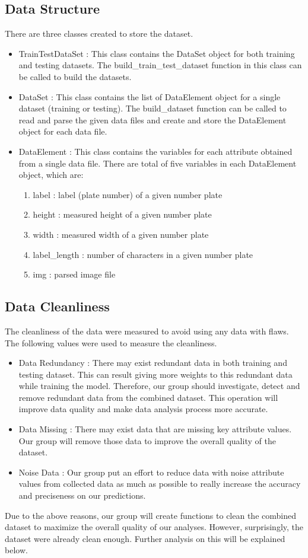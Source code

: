 \documentclass[conference]{IEEEtran}
\begin{document}
\subsection{Data Structure}
There are three classes created to store the dataset.
\begin{itemize}
\item TrainTestDataSet : This class contains the DataSet object for both training and testing datasets. The build\_train\_test\_dataset function in this class can be called to build the datasets.
\item DataSet : This class contains the list of DataElement object for a single dataset (training or testing). The build\_dataset function can be called to read and parse the given data files and create and store the DataElement object for each data file.
\item DataElement : This class contains the variables for each attribute obtained from a single data file. There are total of five variables in each DataElement object, which are:
\begin{enumerate}
\item label : label (plate number) of a given number plate
\item height : measured height of a given number plate
\item width : measured width of a given number plate
\item label\_length  : number of characters in a given number plate
\item img : parsed image file
\end{enumerate}
\end{itemize}

\subsection{Data Cleanliness}
The cleanliness of the data were measured to avoid using any data with flaws. The following values were used to measure the cleanliness.
\begin{itemize}
\item Data Redundancy : There may exist redundant data in both training and testing dataset. This can result giving more weights to this redundant data while training the model. Therefore, our group should investigate, detect and remove redundant data from the combined dataset. This operation will improve data quality and make data analysis process more accurate.
\item Data Missing : There may exist data that are missing key attribute values. Our group will remove those data to improve the overall quality of the dataset.
\item Noise Data : Our group put an effort to reduce data with noise attribute values from collected data as much as possible to really increase the accuracy and preciseness on our predictions.
\end{itemize}
Due to the above reasons, our group will create functions to clean the combined dataset to maximize the overall quality of our analyses. However, surprisingly, the dataset were already clean enough. Further analysis on this will be explained below.
\end{document}
